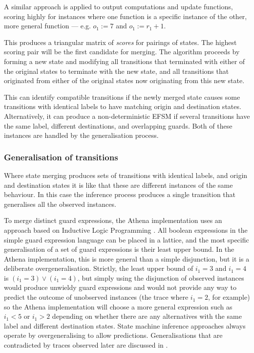 A similar approach is applied to output computations and update functions, scoring highly for instances where one function is a specific instance of the other, more general function --- e.g. $o_1 := 7$ and $o_1 := r_1 + 1$.

This produces a triangular matrix of \emph{scores} for pairings of states. The highest scoring pair will be the first candidate for merging. The algorithm proceeds by forming a new state and modifying all transitions that terminated with either of the original states to terminate with the new state, and all transitions that originated from either of the original states now originating from this new state.

This can identify compatible transitions if the newly merged state causes some transitions with identical labels to have matching origin and destination states. Alternatively, it can produce a non-deterministic EFSM if several transitions have the same label, different destinations, and overlapping guards. Both of these instances are handled by the generalisation process.

\subsubsection{Generalisation of transitions}
\label{Generalisation}

Where state merging produces sets of transitions with identical labels, and origin and destination states it is like that these are different instances of the same behaviour. In this case the inference process produces a single transition that generalises all the observed instances.

To merge distinct guard expressions, the Athena implementation uses an approach based on Inductive Logic Programming \cite{ILP}. All boolean expressions in the simple guard expression language can be placed in a lattice, and the most specific generalisation of a set of guard expressions is their least upper bound. In the Athena implementation, this is more general than a simple disjunction, but it is a deliberate overgeneralisation. Strictly, the least upper bound of $i_1 = 3$ and $i_1 = 4$ is $(i_1 = 3) \lor (i_1 = 4)$, but simply using the disjunction of observed instances would produce unwieldy guard expressions and would not provide any way to predict the outcome of unobserved instances (the trace where $i_1 = 2$, for example) so the Athena implementation will choose a more general expression such as $i_1 < 5$ or $i_1 > 2$ depending on whether there are any alternatives with the same label and different destination states. State machine inference approaches always operate by overgeneralising to allow predictions. Generalisations that are contradicted by traces observed later are discussed in .


